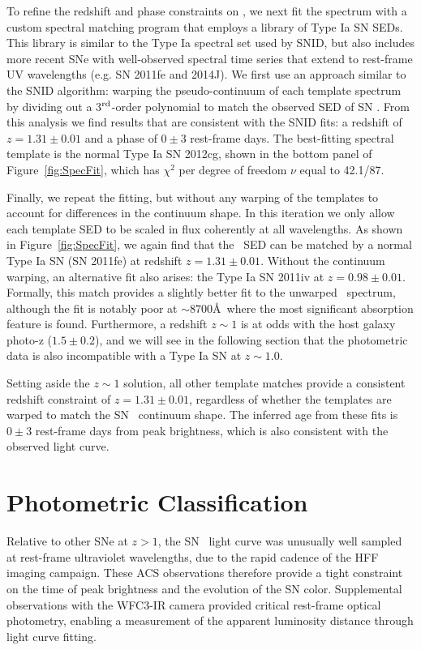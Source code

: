 To refine the redshift and phase constraints on \tomas, we next fit
the spectrum with a custom spectral matching program that employs a
library of Type Ia SN SEDs.  This library is similar to the Type Ia
spectral set used by SNID, but also includes more recent SNe with
well-observed spectral time series that extend to rest-frame UV
wavelengths (e.g. SN 2011fe and 2014J).  We first use an approach
similar to the SNID algorithm: warping the pseudo-continuum of each
template spectrum by dividing out a 3$^{\rm rd}$-order polynomial to
match the observed SED of SN \tomas.  From this analysis we find
results that are consistent with the SNID fits: a redshift of
$z=1.31\pm0.01$ and a phase of $0\pm3$ rest-frame days. The
best-fitting spectral template is the normal Type Ia SN 2012cg, shown
in the bottom panel of Figure~\ref{fig:SpecFit}, which has $\chi^2$
per degree of freedom $\nu$ equal to 42.1/87.

Finally, we repeat the fitting, but without any warping of the
templates to account for differences in the continuum shape.  In this
iteration we only allow each template SED to be scaled in flux
coherently at all wavelengths.  As shown in Figure~\ref{fig:SpecFit},
we again find that the \tomas\ SED can be matched by a normal Type Ia
SN (SN 2011fe) at redshift $z=1.31\pm0.01$.  Without the continuum
warping, an alternative fit also arises: the  Type Ia SN 2011iv
at $z=0.98\pm0.01$. Formally, this match provides a slightly better
fit to the unwarped \tomas\ spectrum, although the fit is notably poor
at $\sim8700$\AA\ where the most significant absorption feature is
found. Furthermore, a redshift $z\sim1$ is at odds with the host
galaxy photo-z ($1.5\pm0.2$), and we will see in the following section
that the photometric data is also incompatible with a Type Ia SN at
$z\sim1.0$.

Setting aside the $z\sim1$ solution, all other template matches
provide a consistent redshift constraint of $z=1.31\pm0.01$,
regardless of whether the templates are warped to match the SN \tomas\
continuum shape.  The inferred age from these fits is $0\pm3$
rest-frame days from peak brightness, which is also consistent with
the observed light curve.


\section{Photometric Classification}
\label{sec:PhotometricClassification}

Relative to other SNe at $z>1$, the SN \tomas\ light curve was
unusually well sampled at rest-frame ultraviolet wavelengths, due to
the rapid cadence of the HFF imaging campaign. These ACS observations
therefore provide a tight constraint on the time of peak brightness
and the evolution of the SN color.  Supplemental observations with the
WFC3-IR camera provided critical rest-frame optical photometry,
enabling a measurement of the apparent luminosity distance through
light curve fitting.

